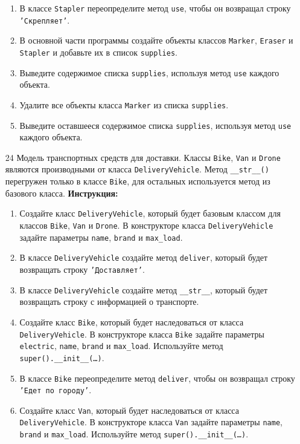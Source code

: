 \begin{enumerate}
\begin{enumerate}
    \item В классе \texttt{Stapler} переопределите метод \texttt{use}, чтобы он возвращал строку \texttt{'Скрепляет'}.
    \item В основной части программы создайте объекты классов \texttt{Marker}, \texttt{Eraser} и \texttt{Stapler} и добавьте их в список \texttt{supplies}.
    \item Выведите содержимое списка \texttt{supplies}, используя метод \texttt{use} каждого объекта.
    \item Удалите все объекты класса \texttt{Marker} из списка \texttt{supplies}.
    \item Выведите оставшееся содержимое списка \texttt{supplies}, используя метод \texttt{use} каждого объекта.
\end{enumerate}
\item[24]
Модель транспортных средств для доставки. Классы \texttt{Bike}, \texttt{Van} и \texttt{Drone} являются производными от класса \texttt{DeliveryVehicle}. Метод \texttt{\_\_str\_\_()} перегружен только в классе \texttt{Bike}, для остальных используется метод из базового класса.
\textbf{Инструкция:}
\begin{enumerate}
    \item Создайте класс \texttt{DeliveryVehicle}, который будет базовым классом для классов \texttt{Bike}, \texttt{Van} и \texttt{Drone}. В конструкторе класса \texttt{DeliveryVehicle} задайте параметры \texttt{name}, \texttt{brand} и \texttt{max\_load}.
    \item В классе \texttt{DeliveryVehicle} создайте метод \texttt{deliver}, который будет возвращать строку \texttt{'Доставляет'}.
    \item В классе \texttt{DeliveryVehicle} создайте метод \texttt{\_\_str\_\_}, который будет возвращать строку с информацией о транспорте.
    \item Создайте класс \texttt{Bike}, который будет наследоваться от класса \texttt{DeliveryVehicle}. В конструкторе класса \texttt{Bike} задайте параметры \texttt{electric}, \texttt{name}, \texttt{brand} и \texttt{max\_load}. Используйте метод \texttt{super().\_\_init\_\_(\ldots)}.
    \item В классе \texttt{Bike} переопределите метод \texttt{deliver}, чтобы он возвращал строку \texttt{'Едет по городу'}.
    \item Создайте класс \texttt{Van}, который будет наследоваться от класса \texttt{DeliveryVehicle}. В конструкторе класса \texttt{Van} задайте параметры \texttt{name}, \texttt{brand} и \texttt{max\_load}. Используйте метод \texttt{super().\_\_init\_\_(\ldots)}.

\end{enumerate}
\end{enumerate}
